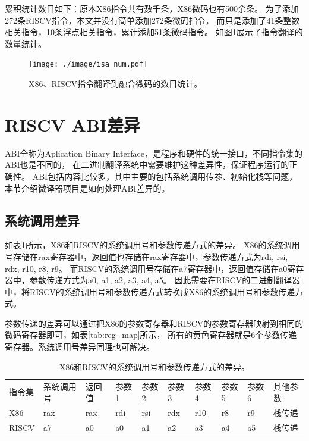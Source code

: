 累积统计数目如下：原本X86指令共有数千条，X86微码也有500余条。
为了添加272条RISCV指令，本文并没有简单添加272条微码指令，
而只是添加了41条整数相关指令，10条浮点相关指令，累计添加51条微码指令。
如图\ref{img:isa_num}展示了指令翻译的数量统计。


\begin{figure}[!htbp]
  \centering
  \texttt{[image: ./image/isa\_num.pdf]}
  \caption{X86、RISCV指令翻译到融合微码的数目统计。}
  \label{img:isa_num}
\end{figure}



\section{RISCV ABI差异}
ABI全称为Aplication Binary Interface，是程序和硬件的统一接口，不同指令集的ABI也是不同的，
在二进制翻译系统中需要维护这种差异性，保证程序运行的正确性。
ABI包括内容比较多，其中主要的包括系统调用传参、初始化栈等问题，本节介绍微译器项目是如何处理ABI差异的。


\subsection{系统调用差异}

如表\ref{tab:syscall}所示，X86和RISCV的系统调用号和参数传递方式的差异。
X86的系统调用号存储在rax寄存器中，返回值也存储在rax寄存器中，参数传递方式为rdi, rsi, rdx, r10, r8, r9。
而RISCV的系统调用号存储在a7寄存器中，返回值存储在a0寄存器中，参数传递方式为a0, a1, a2, a3, a4, a5。
因此需要在RISCV的二进制翻译器中，将RISCV的系统调用号和参数传递方式转换成X86的系统调用号和参数传递方式。

参数传递的差异可以通过把X86的参数寄存器和RISCV的参数寄存器映射到相同的微码寄存器即可，如表\ref{tab:reg_map}所示，
所有的黄色寄存器就是6个参数传递寄存器。系统调用号差异同理也可解决。



\begin{table}[h]
    \centering
    \begin{adjustbox}{width=\textwidth}
      \begin{tabular}{llllllllll}
      \rowcolor[HTML]{FFCC67} 
      \cellcolor[HTML]{FBE5D6}指令集 & \cellcolor[HTML]{FBE5D6}系统调用号 & \cellcolor[HTML]{FBE5D6}返回值 & 参数1 & 参数2 & 参数3 & 参数4 & 参数5 & 参数6 & 其他参数 \\
      X86                         & rax                           & rax                         & rdi & rsi & rdx & r10 & r8  & r9  & 栈传递  \\
      RISCV                       & a7                            & a0                          & a0  & a1  & a2  & a3  & a4  & a5  & 栈传递 
      \end{tabular}
    \end{adjustbox}
    \caption{X86和RISCV的系统调用号和参数传递方式的差异。}
    \label{tab:syscall}
  \end{table}
  


